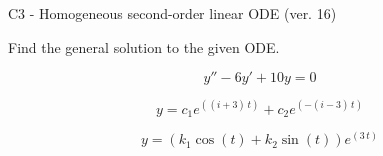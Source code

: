 \begin{exercise}
  \begin{exerciseTitle}C3 - Homogeneous second-order linear ODE (ver. 16)\end{exerciseTitle}
  \begin{exerciseStatement}
    
Find the general solution to the given ODE.

    
\[y''-6y'+10y = 0\]

  \end{exerciseStatement}
  \begin{exerciseAnswer}
    
\[y= c_{1} e^{\left(\left(i + 3\right) \, t\right)} + c_{2} e^{\left(-\left(i - 3\right) \, t\right)}\]

    
\[y= {\left(k_{1} \cos\left(t\right) + k_{2} \sin\left(t\right)\right)} e^{\left(3 \, t\right)}\]

  \end{exerciseAnswer}
\end{exercise}